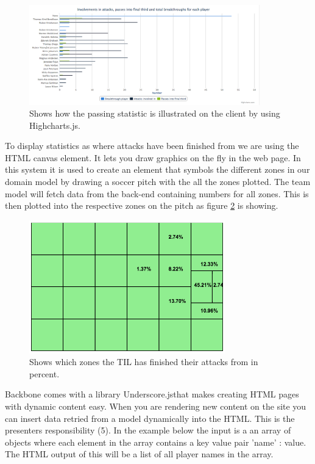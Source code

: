 
\begin{figure}[ht!]
\centering
\includegraphics[width=100mm]{images/general/chart_passes.png}
\caption{Shows how the passing statistic is illustrated on the client by using Highcharts.js.}
\label{fig:chart}
\end{figure}

To display statistics as where attacks have been finished from we are using the \ac{HTML} canvas element. It lets you draw graphics on the fly in the web page. In this system it is used to create an element that symbols the different zones in our domain model by drawing a soccer pitch with the all the zones plotted. The team model will fetch data from the back-end containing numbers for all zones. This is then plotted into the respective zones on the pitch as figure \ref{fig:attacking_zones} is showing.

\begin{figure}[ht!]
\centering
\includegraphics[width=85mm]{images/general/finishing_zones.png}
\caption{Shows which zones the \ac{TIL} has finished their attacks from in percent.}
\label{fig:attacking_zones}
\end{figure}

Backbone comes with a library Underscore.js\footnotemark that makes creating HTML pages with dynamic content easy. When you are rendering new content on the site you can insert data retried from a model dynamically into the HTML. This is the presenters responsibility (5). In the example below the input is a an array of objects where each element in the array contains a key value pair 'name' : value. The HTML output of this will be a list of all player names in the array. 

